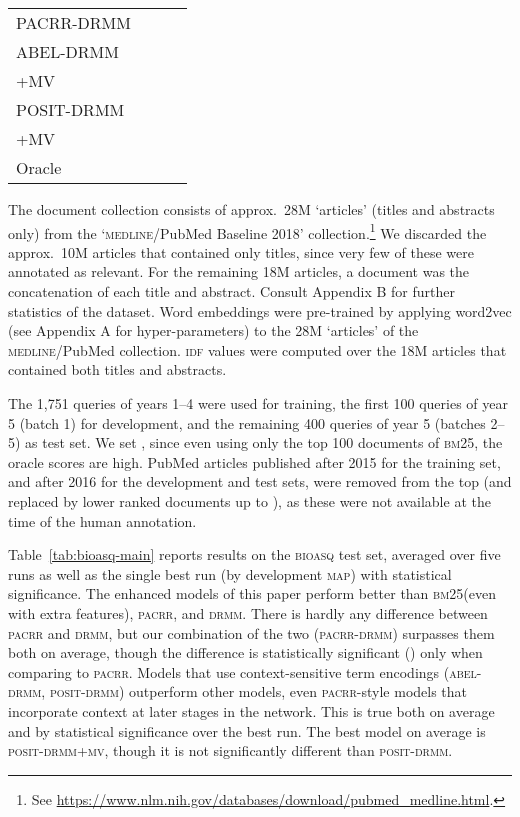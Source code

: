 \documentclass[11pt,a4paper]{article}
\newcommand{\bioasq}{\textsc{bioasq}\xspace}
\newcommand{\trecrob}{\textsc{trec robust}\xspace}
\newcommand{\drmm}{\textsc{drmm}\xspace}
\newcommand{\pacrr}{\textsc{pacrr}\xspace}
\newcommand{\pacrrdrmm}{\textsc{pacrr-drmm}\xspace}
\newcommand{\abeldrmm}{\textsc{abel-drmm}\xspace}
\newcommand{\abeldrmmmv}{\textsc{abel-drmm+mv}\xspace}
\newcommand{\positdrmm}{\textsc{posit-drmm}\xspace}
\newcommand{\positdrmmmv}{\textsc{posit-drmm+mv}\xspace}
\newcommand{\bmtf}{\textsc{bm25}\xspace}
\newcommand{\idf}{\textsc{idf}\xspace}
\newcommand{\map}{\textsc{map}\xspace}
\newcommand{\medline}{\textsc{medline}\xspace}
\begin{document}
\begin{table*}[t]
\begin{minipage}{3.1in}
\begin{center}
\begin{tabular}{|llll|}
PACRR-DRMM  &  &  &  \\
ABEL-DRMM   &  &  &  \\
+MV  &  &  &  \\
POSIT-DRMM  &  &  & \\
+MV  &  &  & \\ \hline\hline
Oracle      &  &  &  \\ \hline
\end{tabular}
\end{center}
\end{minipage}
\vspace{-0.1in}
\caption{Performance on \trecrob 
test data. Statistically significant () 
difference from  \bmtf; {\sc bm25}+extra; \pacrr; \drmm; \pacrrdrmm; \abeldrmm; \abeldrmmmv.}
\label{tab:rob04-test}
\vspace{-2mm}
\end{table*}

The document collection consists of approx.\
28M `articles' (titles and abstracts only) from the `\medline/PubMed Baseline 2018' collection.\footnote{See \url{https://www.nlm.nih.gov/databases/download/pubmed_medline.html}.} We discarded the approx.\ 10M articles that contained only titles, since very few of these were annotated as relevant. For  the remaining 18M articles, a document was the concatenation of each title and abstract. Consult Appendix B for further statistics of the dataset. Word embeddings were pre-trained by applying word2vec \cite{mikolov2013distributed} (see Appendix A for hyper-parameters) to the 28M `articles' of the \medline/PubMed collection. \idf values were computed over the 18M articles that contained both titles and abstracts.

The 1,751 queries of years 1--4 were used for training, the first 100 queries of year 5 (batch 1) for development, and the remaining 400 queries of year 5 (batches 2--5) as test set. We set , since even using only the top 100 documents of \bmtf, the oracle scores are high. 
PubMed articles published after 2015 for the training set, and after 2016 for the development and test sets, were removed from the top  (and replaced by lower ranked documents up to ), as these were not available at the time of the human annotation.

Table~\ref{tab:bioasq-main} reports results on the \bioasq test set, averaged over five runs as well as the single best run (by development \map) with statistical significance. 
The enhanced models of this paper perform better than \bmtf (even with extra features), \pacrr, and \drmm. There is hardly any difference between \pacrr and \drmm, but our combination of the two (\pacrrdrmm) surpasses them both on average, 
though the difference is statistically significant () only when comparing to \pacrr. 
Models that use context-sensitive term encodings (\abeldrmm, \positdrmm) outperform other models, even \pacrr-style models that incorporate context at later stages in the network. This is true both on average and by statistical significance over the best run. The best model on average is \positdrmmmv, though it is not significantly different than \positdrmm.
\end{document}

